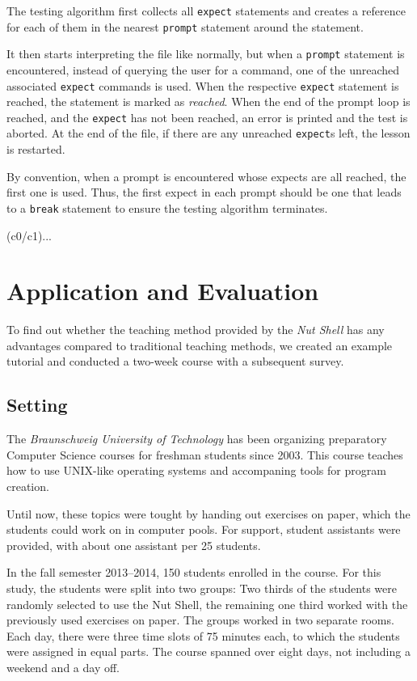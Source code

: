 \documentclass[paper=a4,twoside,abstract=on,cleardoublepage=empty,numbers=noenddot,toc=bib,12pt]{scrreprt}
\begin{document}
The testing algorithm first collects all \texttt{expect} statements and creates a reference for each of them in the nearest \texttt{prompt} statement around the statement.

It then starts interpreting the file like normally, but when a \texttt{prompt} statement is encountered, instead of querying the user for a command, one of the unreached associated \texttt{expect} commands is used. When the respective \texttt{expect} statement is reached, the statement is marked as \emph{reached}. When the end of the prompt loop is reached, and the \texttt{expect} has not been reached, an error is printed and the test is aborted. At the end of the file, if there are any unreached \texttt{expect}s left, the lesson is restarted.

By convention, when a prompt is encountered whose expects are all reached, the first one is used. Thus, the first expect in each prompt should be one that leads to a \texttt{break} statement to ensure the testing algorithm terminates.

(c0/c1)...

\chapter{Application and Evaluation}

To find out whether the teaching method provided by the \emph{Nut Shell} has any advantages compared to traditional teaching methods, we created an example tutorial and conducted a two-week course with a subsequent survey.

\section{Setting}

The \textit{Braunschweig University of Technology} has been organizing preparatory Computer Science courses for freshman students since 2003. This course teaches how to use UNIX-like operating systems and accompaning tools for program creation.

Until now, these topics were tought by handing out exercises on paper, which the students could work on in computer pools. For support, student assistants were provided, with about one assistant per 25 students.

In the fall semester 2013--2014, 150 students enrolled in the course. For this study, the students were split into two groups: Two thirds of the students were randomly selected to use the Nut Shell, the remaining one third worked with the previously used exercises on paper. The groups worked in two separate rooms. Each day, there were three time slots of 75 minutes each, to which the students were assigned in equal parts. The course spanned over eight days, not including a weekend and a day off.
\end{document}
